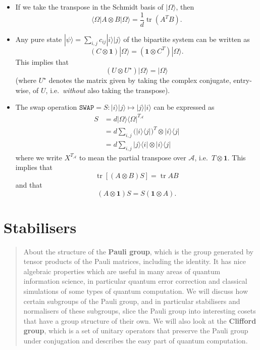 \documentclass[fleqn]{article}
\let\oldsection\section
\renewcommand\section{\clearpage\oldsection}
\begin{document}
\begin{itemize}
\item
  If we take the transpose in the Schmidt basis of \(|\Omega\rangle\), then
  \[
      \langle\Omega|A\otimes B|\Omega\rangle = \frac{1}{d}\operatorname{tr}(A^T B).
    \]
\item
  Any pure state \(|\psi\rangle=\sum_{i,j} c_{ij}|i\rangle|j\rangle\) of the bipartite system can be written as
  \[
      (C\otimes\mathbf{1})|\Omega\rangle = (\mathbf{1}\otimes C^T)|\Omega\rangle.
    \]
  This implies that
  \[
      (U\otimes U^\star)|\Omega\rangle=|\Omega\rangle
    \]
  (where \(U^\star\) denotes the matrix given by taking the complex conjugate, entry-wise, of \(U\), i.e.~\emph{without} also taking the transpose).
\item
  The swap operation \(\texttt{SWAP}=S\colon|i\rangle|j\rangle\mapsto|j\rangle|i\rangle\) can be expressed as
  \[
      \begin{aligned}
        S
        &= d |\Omega\rangle\langle\Omega|^{T_{\mathcal{A}}}
      \\&= d \sum_{i,j} \big(|i\rangle\langle j|\big)^T\otimes|i\rangle\langle j|
      \\&= d \sum_{i,j} |j\rangle\langle i|\otimes|i\rangle\langle j|
      \end{aligned}
    \]
  where we write \(X^{T_{\mathcal{A}}}\) to mean the partial transpose over \(\mathcal{A}\), i.e.~\(T\otimes\mathbf{1}\).
  This implies that
  \[
      \operatorname{tr}[(A\otimes B)S] = \operatorname{tr}AB
    \]
  and that
  \[
      (A\otimes\mathbf{1})S = S(\mathbf{1}\otimes A).
    \]
\end{itemize}

\hypertarget{stabilisers}{%
\section{Stabilisers}\label{stabilisers}}

\begin{quote}
About the structure of the \textbf{Pauli group}, which is the group generated by tensor products of the Pauli matrices, including the identity.
It has nice algebraic properties which are useful in many areas of quantum information science, in particular quantum error correction and classical simulations of some types of quantum computation.
We will discuss how certain subgroups of the Pauli group, and in particular stabilisers and normalisers of these subgroups, slice the Pauli group into interesting cosets that have a group structure of their own.
We will also look at the \textbf{Clifford group}, which is a set of unitary operators that preserve the Pauli group under conjugation and describes the easy part of quantum computation.
\end{quote}
\end{document}
